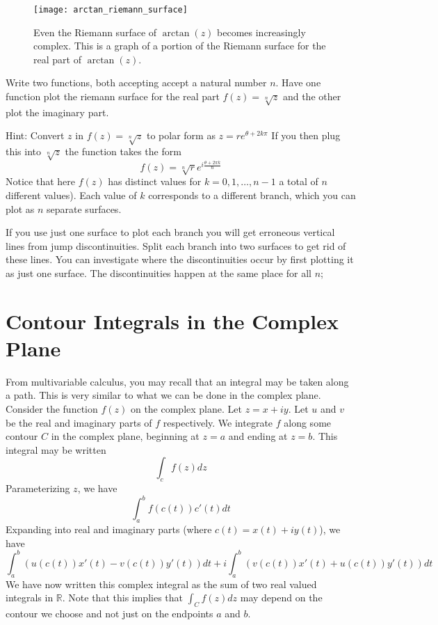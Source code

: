 \begin{figure}
\texttt{[image: arctan\_riemann\_surface]}
\caption{Even the Riemann surface of $\arctan(z)$ becomes increasingly complex.
This is a graph of a portion of the Riemann surface for the real part of $\arctan(z)$.}
\label{fig:arctan_riemann_surface}
\end{figure}

\begin{problem}
Write two functions, both accepting accept a natural number $n$.
Have one function plot the riemann surface for the real part $f(z)=\sqrt[n]{z}$ and the other plot the imaginary part.

Hint: Convert $z$ in $f(z)=\sqrt[n]{z}$ to polar form as $z=re^{\theta + 2k\pi}$
If you then plug this into $\sqrt[n]{z}$ the function takes the form
\[f(z)=\sqrt[n]{r} e^{i \frac{\theta + 2 \pi k}{n}}\]
Notice that here $f(z)$ has distinct values for $k = 0, 1, \dots, n-1$ a total of $n$ different values). Each value of $k$ corresponds to a different branch, which you can plot as $n$ separate surfaces.

If you use just one surface to plot each branch you will get erroneous vertical lines from jump discontinuities. Split each branch into two surfaces to get rid of these lines. You can investigate where the discontinuities occur by first plotting it as just one surface. The discontinuities happen at the same place for all $n$;
\end{problem}

\section*{Contour Integrals in the Complex Plane}

From multivariable calculus, you may recall that an integral may be taken along a path.
This is very similar to what we can be done in the complex plane.
Consider the function $f(z)$ on the complex plane.
Let $z=x+iy$.
Let $u$ and $v$ be the real and imaginary parts of $f$ respectively.
We integrate $f$ along some contour $C$ in the complex plane, beginning at $z=a$ and ending at $z=b$.
This integral may be written
\[\int_c f(z)dz\]
Parameterizing $z$, we have
\[\int_a^b f\left( c\left(t\right)\right) c'\left(t\right) dt\]
Expanding into real and imaginary parts (where $c\left(t\right) = x\left(t\right) + i y\left(t\right)$), we have
\[\int_a^b \left(u \left(c \left(t\right)\right) x'\left(t\right)-v\left(c \left(t\right)\right) y'\left(t\right)\right) dt + i \int_a^b\left(v \left(c \left(t\right)\right)x'\left(t\right)+u\left(c \left(t\right)\right) y'\left(t\right)\right) dt\]
We have now written this complex integral as the sum of two real valued integrals in $\mathbb{R}$.
Note that this implies that $\int_C f(z) dz$ may depend on the contour we choose and not just on the endpoints $a$ and $b$.

